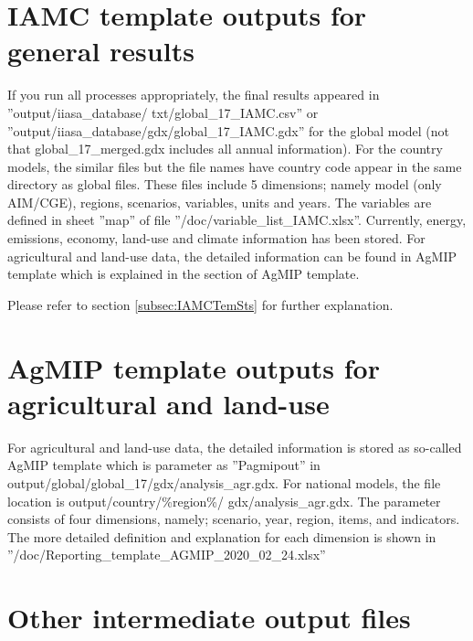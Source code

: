 \documentclass[10pt,a4paper,titlepage,dvipdfmx]{book}
\begin{document}
\section{\label{sec:IAMCTemOut}IAMC template outputs for general results}

If you run all processes appropriately, the final results appeared in ''output/iiasa\_database/ txt/global\_17\_IAMC.csv'' or ''output/iiasa\_database/gdx/global\_17\_IAMC.gdx'' for the global model (not that global\_17\_merged.gdx includes all annual information). 
For the country models, the similar files but the file names have country code appear in the same directory as global files. These files include 5 dimensions; namely model (only AIM/CGE), regions, scenarios, variables, units and years. The variables are defined in sheet ''map'' of file ''/doc/variable\_list\_IAMC.xlsx''. Currently, energy, emissions, economy, land-use and climate information has been stored. For agricultural and land-use data, the detailed information can be found in AgMIP template which is explained in the section of AgMIP template.

Please refer to section \ref{subsec:IAMCTemSts} for further explanation.

\section{\label{sec:AgMIPTemOut}AgMIP template outputs for agricultural and land-use}

     For agricultural and land-use data, the detailed information is stored as so-called AgMIP template which is parameter as ''Pagmipout'' in output/global/global\_17/gdx/analysis\_agr.gdx. For national models, the file location is output/country/\%region\%/ gdx/analysis\_agr.gdx. The parameter consists of four dimensions, namely; scenario, year, region, items, and indicators. The more detailed definition and explanation for each dimension is shown in ''/doc/Reporting\_template\_AGMIP\_2020\_02\_24.xlsx''

\section{\label{sec:OthrIntOutFile}Other intermediate output files}
\end{document}
